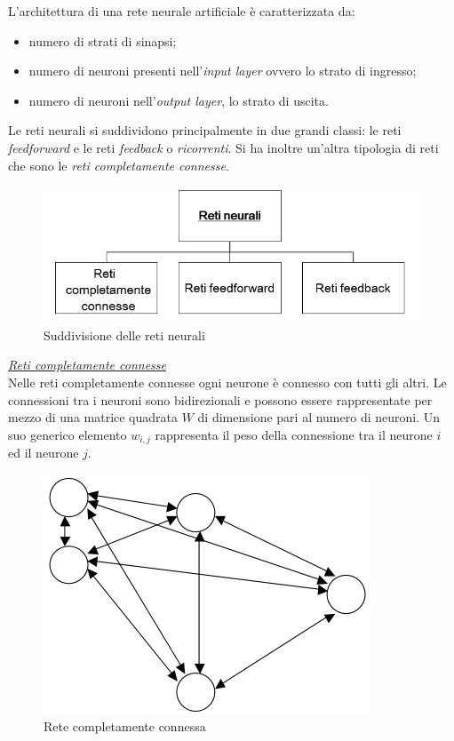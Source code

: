 \documentclass[12pt,a4paper,oneside]{book}
\begin{document}
		L'architettura di una rete neurale artificiale è caratterizzata da:
		
		\begin{itemize}
			\item numero di strati di sinapsi;
			\item numero di neuroni presenti nell'\emph{input layer} ovvero lo strato di ingresso;
			\item numero di neuroni nell'\emph{output layer}, lo strato di uscita.
		\end{itemize}
	
		Le reti neurali si suddividono principalmente in due grandi classi: le reti \emph{feedforward} e le reti \emph{feedback} o \emph{ricorrenti}. 
		Si ha inoltre un'altra tipologia di reti che sono le \emph{reti completamente connesse}.\\
		
		\begin{figure}[h]
			\centering
			\includegraphics[width=0.75\linewidth]{IMMAGINI/diagrammareti}
			\caption{ Suddivisione delle reti neurali}
			\label{fig:diagrammareti}
		\end{figure}
		
		\underline{\emph{Reti completamente connesse}}\\
		Nelle reti completamente connesse ogni neurone è connesso con tutti gli altri. Le connessioni tra i neuroni sono bidirezionali e possono essere rappresentate per mezzo di una matrice quadrata $W$ di dimensione pari al numero di neuroni. Un suo generico elemento $w_{i,j}$ rappresenta il peso della connessione tra il neurone $i$ ed il neurone $j$.  
		
		\begin{figure}[h!]
			\centering
			\includegraphics[width=0.5\linewidth]{IMMAGINI/completamenteconnesssa}
			\caption{ Rete completamente connessa}
			\label{fig:completamenteconnesssa}
		\end{figure}
		
\end{document}
